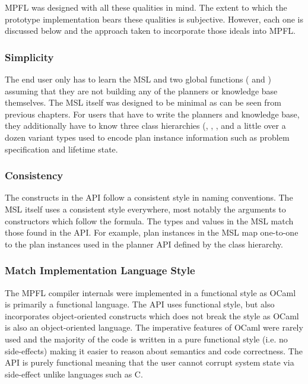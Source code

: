MPFL was designed with all these qualities in mind. The extent to which the prototype implementation bears these qualities is subjective. However, each one is discussed below and the approach taken to incorporate those ideals into MPFL.

\subsubsection{Simplicity}
The end user only has to learn the MSL and two global functions ( and ) assuming that they are not building any of the planners or knowledge base themselves. The MSL itself was designed to be minimal as can be seen from previous chapters. For users that have to write the planners and knowledge base, they additionally have to know three class hierarchies (, , , and a little over a dozen variant types used to encode plan instance information such as problem specification and lifetime state. 

\subsubsection{Consistency}
The constructs in the API follow a consistent style in naming conventions. The MSL itself uses a consistent style everywhere, most notably the arguments to constructors which follow the  formula. The types and values in the MSL match those found in the API. For example, plan instances in the MSL map one-to-one to the plan instances used in the planner API defined by the  class hierarchy.

\subsubsection{Match Implementation Language Style}
The MPFL compiler internals were implemented in a functional style as OCaml is primarily a functional language. The API uses functional style, but also incorporates object-oriented constructs which does not break the style as OCaml is also an object-oriented language. The imperative features of OCaml were rarely used and the majority of the code is written in a pure functional style (i.e. no side-effects) making it easier to reason about semantics and code correctness. The API is purely functional meaning that the user cannot corrupt system state via side-effect unlike languages such as C.

